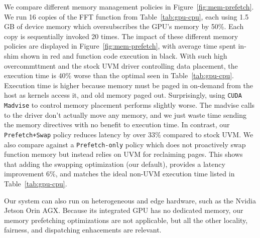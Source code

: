We compare different memory management policies in Figure~\ref{fig:mem-prefetch}.
We run 16 copies of the FFT function from Table~\ref{tab:gpu-cpu}, each using 1.5 GB of device memory which oversubscribes the GPU's memory by 50\%. 
Each copy is sequentially invoked 20 times.
The impact of these different memory policies are displayed in Figure~\ref{fig:mem-prefetch}, with average time spent in-shim shown in red and function code execution in black.
With such high overcommttment and the stock UVM driver controlling data placement, the  execution time is 40\% worse than the optimal seen in Table~\ref{tab:gpu-cpu}.
Execution time is higher because memory must be paged in on-demand from the host as kernels access it, and old memory paged out.
Surprisingly, using \texttt{CUDA Madvise} to control memory placement performs slightly worse. 
The madvise calls to the driver don't actually move any memory, and we just waste time sending the memory directives with no benefit to execution time. 
In contrast, our \texttt{Prefetch+Swap} policy reduces latency by over 33\% compared to stock UVM.
We also compare against a \texttt{Prefetch-only} policy which does not proactively swap function memory but instead relies on UVM for reclaiming pages. 
This shows that adding the swapping optimization (our default), provides a latency improvement 6\%, and matches the ideal non-UVM execution time listed in Table~\ref{tab:gpu-cpu}. 

Our system can also run on heterogeneous and edge hardware, such as the Nvidia Jetson Orin AGX. 
Because its integrated GPU has no dedicated memory, our memory prefetching optimizations are not applicable, but all the other locality, fairness, and dispatching enhacements are relevant. 


